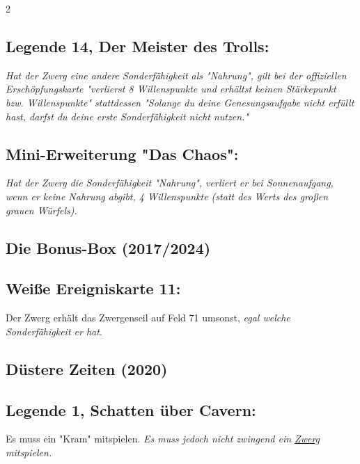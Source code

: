 \documentclass[10pt, a4paper, oneside]{book}
\newcommand{\fan}[1]{\textit{#1}}
\begin{document}
\begin{multicols*}{2}
\begin{bgcolor}
\subsection{Legende 14, Der Meister des Trolls:}

\fan{Hat der Zwerg eine andere Sonderfähigkeit als "Nahrung", gilt bei der offiziellen Erschöpfungskarte "verlierst 8 Willenspunkte und erhältst keinen Stärkepunkt bzw. Willenspunkte" stattdessen "Solange du deine Genesungsaufgabe nicht erfüllt hast, darfst du deine erste Sonderfähigkeit nicht nutzen."}


\subsection{Mini-Erweiterung "Das Chaos":}

\fan{Hat der Zwerg die Sonderfähigkeit "Nahrung", verliert er bei Sonnenaufgang, wenn er keine Nahrung abgibt, 4 Willenspunkte (statt des Werts des großen grauen Würfels).}

\end{bgcolor}




\begin{bgcolor}[color-bb]
\section{Die Bonus-Box (2017/2024)}

\subsection{Weiße Ereigniskarte 11:}

Der Zwerg erhält das Zwergenseil auf Feld 71 umsonst, 
\supercite{bb-ereigniskarte-11}
\fan{egal welche Sonderfähigkeit er hat}.

\end{bgcolor}


\begin{bgcolor}[color-dz]
\section{Düstere Zeiten (2020)}

\subsection{Legende 1, Schatten über Cavern:}

Es muss ein "Kram" mitspielen.
\supercite{dz-begleitheft}
\fan{Es muss jedoch nicht zwingend ein \hyperref[zwerg]{Zwerg} mitspielen.} 


\end{bgcolor}
\end{multicols*}
\end{document}
